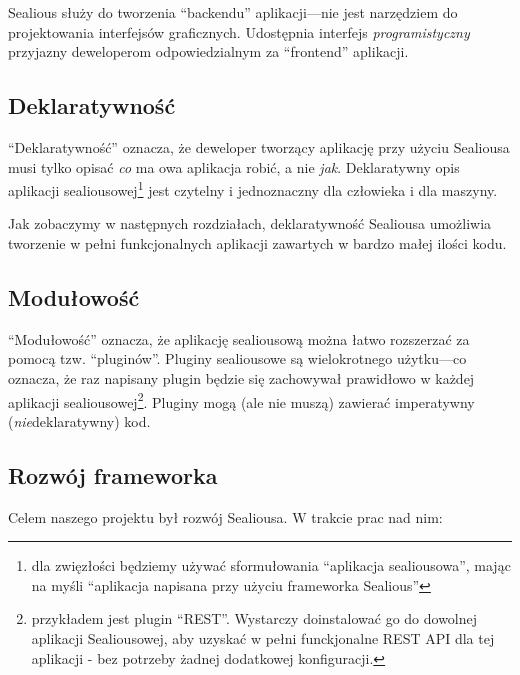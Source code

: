 \documentclass[12pt,polish,a4paper,]{report}
\begin{document}
Sealious służy do tworzenia ``backendu'' aplikacji---nie jest narzędziem
do projektowania interfejsów graficznych. Udostępnia interfejs
\emph{programistyczny} przyjazny deweloperom odpowiedzialnym za
``frontend'' aplikacji.

\subsection{Deklaratywność}\label{deklaratywnoux15bux107}

``Deklaratywność'' oznacza, że deweloper tworzący aplikację przy użyciu
Sealiousa musi tylko opisać \emph{co} ma owa aplikacja robić, a nie
\emph{jak}. Deklaratywny opis aplikacji sealiousowej\footnote{dla
  zwięzłości będziemy używać sformułowania ``aplikacja sealiousowa'',
  mając na myśli ``aplikacja napisana przy użyciu frameworka Sealious''}
jest czytelny i jednoznaczny dla człowieka i dla maszyny.

Jak zobaczymy w następnych rozdziałach, deklaratywność Sealiousa
umożliwia tworzenie w pełni funkcjonalnych aplikacji zawartych w bardzo
małej ilości kodu.

\subsection{Modułowość}\label{moduux142owoux15bux107}

``Modułowość'' oznacza, że aplikację sealiousową można łatwo rozszerzać
za pomocą tzw. ``pluginów''. Pluginy sealiousowe są wielokrotnego
użytku---co oznacza, że raz napisany plugin będzie się zachowywał
prawidłowo w każdej aplikacji sealiousowej\footnote{przykładem jest
  plugin ``REST''. Wystarczy doinstalować go do dowolnej aplikacji
  Sealiousowej, aby uzyskać w pełni funckjonalne REST API dla tej
  aplikacji - bez potrzeby żadnej dodatkowej konfiguracji.}. Pluginy
mogą (ale nie muszą) zawierać imperatywny (\emph{nie}deklaratywny) kod.

\subsection{Rozwój frameworka}\label{rozwuxf3j-frameworka}

Celem naszego projektu był rozwój Sealiousa. W trakcie prac nad nim:
\end{document}
